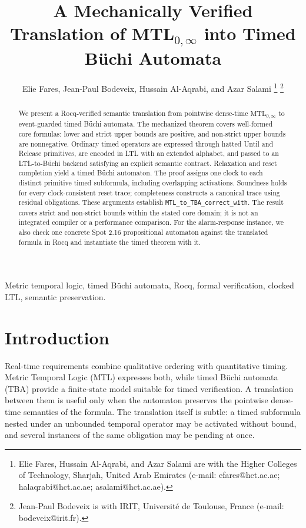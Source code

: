\documentclass[10pt,journal,compsoc]{IEEEtran}
\title{A Mechanically Verified Translation of MTL$_{0,\infty}$ into Timed B\"uchi Automata}
\author{Elie Fares, Jean-Paul Bodeveix, Hussain Al-Aqrabi, and Azar Salami%
\thanks{Elie Fares, Hussain Al-Aqrabi, and Azar Salami are with the Higher Colleges of Technology, Sharjah, United Arab Emirates (e-mail: efares@hct.ac.ae; halaqrabi@hct.ac.ae; asalami@hct.ac.ae).}%
\thanks{Jean-Paul Bodeveix is with IRIT, Universit\'e de Toulouse, France (e-mail: bodeveix@irit.fr).}%
}
\begin{document}
\maketitle

\begin{abstract}
We present a Rocq-verified semantic translation from pointwise dense-time
$\mathrm{MTL}_{0,\infty}$ to event-guarded timed B\"uchi automata. The
mechanized theorem covers well-formed core formulas: lower and strict upper
bounds are positive, and non-strict upper bounds are nonnegative. Ordinary timed operators are expressed through
hatted Until and Release primitives, are encoded in LTL with an extended alphabet, and passed to an
LTL-to-B\"uchi backend satisfying an explicit semantic contract. Relaxation
and reset completion yield a timed B\"uchi automaton. The proof assigns one
clock to each distinct primitive timed subformula, including overlapping
activations. Soundness holds for every clock-consistent reset trace;
completeness constructs a canonical trace using residual obligations. These
arguments establish \texttt{MTL\_to\_TBA\_correct\_with}. The result covers strict and non-strict
bounds within the stated core domain; it is not an integrated compiler or a
performance comparison. For the alarm-response instance, we also check one
concrete Spot 2.16 propositional automaton against the translated formula in
Rocq and instantiate the timed theorem with it.
\end{abstract}

\begin{IEEEkeywords}
Metric temporal logic, timed B\"uchi automata, Rocq, formal verification,
clocked LTL, semantic preservation.
\end{IEEEkeywords}

\section{Introduction}
\label{sec:introduction}
Real-time requirements combine qualitative ordering with quantitative timing.
Metric Temporal Logic (MTL) expresses both, while timed B\"uchi automata (TBA)
provide a finite-state model suitable for timed verification. A translation
between them is useful only when the automaton preserves the pointwise
dense-time semantics of the formula. The translation itself is subtle: a
timed subformula nested under an unbounded temporal operator may be activated
without bound, and several instances of the same obligation may be pending at
once.
\end{document}
